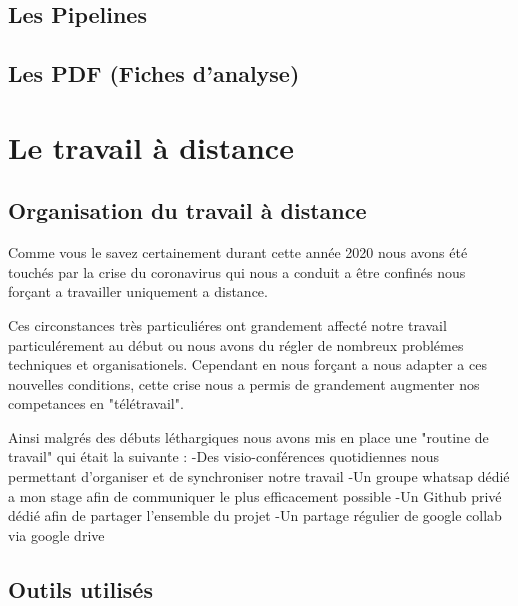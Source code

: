 \hypertarget{Les-Pipelines}{%
\section{Les Pipelines}
\label{Les-Pipelines}}


\hypertarget{Les-PDF}{%
\section{Les PDF (Fiches d'analyse)}
\label{Les-PDF}}



\hypertarget{Le-travail-a-distance}{%
\chapter{Le travail à distance}\label{Le-travail-a-distance}}

\hypertarget{Organisation-du-travail-a-distance}{%
\section{Organisation du travail à distance}\label{Organisation-du-travail-a-distance}}


Comme vous le savez certainement durant cette année 2020 nous avons été touchés par la crise du coronavirus qui nous a conduit a être confinés nous forçant a travailler uniquement a distance.

Ces circonstances très particuliéres ont grandement affecté notre travail particulérement au début ou nous avons du régler de nombreux problémes techniques et organisationels. Cependant en nous forçant a nous adapter a ces nouvelles conditions, cette crise nous a permis de grandement augmenter nos competances en "télétravail".

Ainsi malgrés des débuts léthargiques nous avons mis en place une "routine de travail" qui était la suivante :
-Des visio-conférences quotidiennes nous permettant d'organiser et de synchroniser notre travail
-Un groupe whatsap dédié a mon stage afin de communiquer le plus efficacement possible
-Un Github privé dédié afin de partager l'ensemble du projet
-Un partage régulier de google collab via google drive


\hypertarget{Outils-utilisuxe9s}{%
\section{Outils utilisés}
\label{Outils-utilisuxe9s}}

